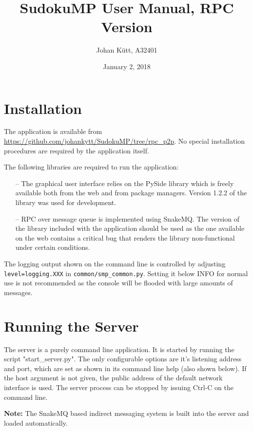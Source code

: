 \documentclass[a4paper]{article}
\title{SudokuMP User Manual, RPC Version}
\author{Johan Kütt, A32401}
\date{January 2, 2018}
\begin{document}
\maketitle

\section{Installation}

The application is available from \url{https://github.com/johankytt/SudokuMP/tree/rpc\_p2p}. No special installation procedures are required by the application itself.

The following libraries are required to run the application:
\begin{itemize}
	\item[--] The graphical user interface relies on the PySide library which is freely available both from the web and from package managers. Version 1.2.2 of the library was used for development.
	\item[--] RPC over message queue is implemented using SnakeMQ. The version of the library included with the application should be used as the one available on the web contains a critical bug that renders the library non-functional under certain conditions.
\end{itemize}

The logging output shown on the command line is controlled by adjusting \texttt{level=logging.XXX} in \texttt{common/smp\_common.py}. Setting it below INFO for normal use is not recommended as the console will be flooded with large amounts of messages.



\section{Running the Server}

The server is a purely command line application. It is started by running the script "start\_server.py". The only configurable options are it's listening address and port, which are set as shown in its command line help (also shown below). If the host argument is not given, the public address of the default network interface is used. The server process can be stopped by issuing Ctrl-C on the command line.

\textbf{Note:} The SnakeMQ based indirect messaging system is built into the server and loaded automatically.

\hrulefill
\end{document}
